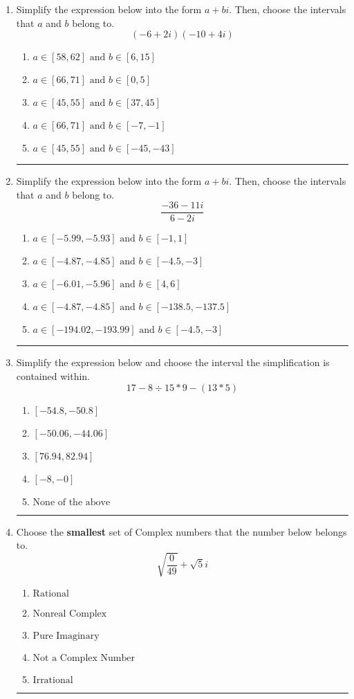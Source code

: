 \documentclass[14pt]{extbook}
\newcommand{\litem}[1]{\item#1\hspace*{-1cm}\rule{\textwidth}{0.4pt}}
\begin{document}
\begin{enumerate}
{\begin{enumerate}[label=\Alph*.]
\end{enumerate} }
\litem{
Simplify the expression below into the form $a+bi$. Then, choose the intervals that $a$ and $b$ belong to.\[ (-6 + 2 i)(-10 + 4 i) \]\begin{enumerate}[label=\Alph*.]
\item \( a \in [58, 62] \text{ and } b \in [6, 15] \)
\item \( a \in [66, 71] \text{ and } b \in [0, 5] \)
\item \( a \in [45, 55] \text{ and } b \in [37, 45] \)
\item \( a \in [66, 71] \text{ and } b \in [-7, -1] \)
\item \( a \in [45, 55] \text{ and } b \in [-45, -43] \)

\end{enumerate} }
\litem{
Simplify the expression below into the form $a+bi$. Then, choose the intervals that $a$ and $b$ belong to.\[ \frac{-36 - 11 i}{6 - 2 i} \]\begin{enumerate}[label=\Alph*.]
\item \( a \in [-5.99, -5.93] \text{ and } b \in [-1, 1] \)
\item \( a \in [-4.87, -4.85] \text{ and } b \in [-4.5, -3] \)
\item \( a \in [-6.01, -5.96] \text{ and } b \in [4, 6] \)
\item \( a \in [-4.87, -4.85] \text{ and } b \in [-138.5, -137.5] \)
\item \( a \in [-194.02, -193.99] \text{ and } b \in [-4.5, -3] \)

\end{enumerate} }
\litem{
Simplify the expression below and choose the interval the simplification is contained within.\[ 17 - 8 \div 15 * 9 - (13 * 5) \]\begin{enumerate}[label=\Alph*.]
\item \( [-54.8, -50.8] \)
\item \( [-50.06, -44.06] \)
\item \( [76.94, 82.94] \)
\item \( [-8, -0] \)
\item \( \text{None of the above} \)

\end{enumerate} }
\litem{
Choose the \textbf{smallest} set of Complex numbers that the number below belongs to.\[ \sqrt{\frac{0}{49}}+\sqrt{5}i \]\begin{enumerate}[label=\Alph*.]
\item \( \text{Rational} \)
\item \( \text{Nonreal Complex} \)
\item \( \text{Pure Imaginary} \)
\item \( \text{Not a Complex Number} \)
\item \( \text{Irrational} \)


\end{enumerate}}
\end{enumerate}
\end{document}
